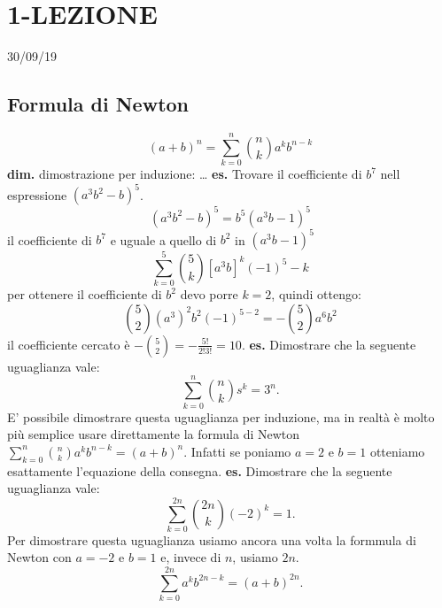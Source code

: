 \section*{1-LEZIONE}
30/09/19
\subsection*{Formula di Newton}
\[
    (a+b)^n = \sum_{k=0}^{n}\binom{n}{k}a^kb^{n-k}
\]
\textbf{dim.} dimostrazione per induzione:
\newline
[manca] \dots
\newline
\newline
\newline
\textbf{es.} Trovare il coefficiente di $b^7$ nell espressione $(a^3b^2-b)^5$.
\[
    (a^3b^2-b)^5 = b^5(a^3b-1)^5
\] 
il coefficiente di $b^7$ e uguale a quello di $b^2$ in $(a^3b-1)^5$
\[
    \sum_{k=0}^5{\binom{5}{k}[a^3b]^k(-1)^5-k}
\] 
per ottenere il coefficiente di $b^2$ devo porre $k=2$, quindi ottengo:
\[
    \binom{5}{2}(a^3)^2b^2(-1)^{5-2} = -\binom{5}{2}a^6b^2
\]
il coefficiente cercato è $-\binom{5}{2} = -\frac{5!}{2!3!} = 10$.
\newline
\newline
\textbf{es.} Dimostrare che la seguente uguaglianza vale:
\[
    \sum_{k=0}^{n}\binom{n}{k}s^k = 3^n.
\] 
E' possibile dimostrare questa uguaglianza per induzione, ma in realtà è molto più semplice usare direttamente la formula di Newton  $\sum_{k=0}^n\binom{n}{k}a^kb^{n-k}=(a+b)^n$. Infatti se poniamo $a=2$ e $b=1$ otteniamo esattamente l'equazione della consegna.
\newline
\newline
\textbf{es.} Dimostrare che la seguente uguaglianza vale:
\[
    \sum_{k=0}^{2n}\binom{2n}{k}(-2)^k=1.
\] 
Per dimostrare questa uguaglianza usiamo ancora una volta la formmula di Newton con $a=-2$ e $b=1$ e, invece di $n$, usiamo $2n$.
\[
    \sum_{k=0}^{2n} a^kb^{2n-k} = ( a+b)^{2n}.
\]

